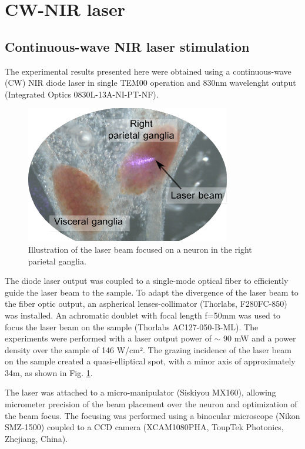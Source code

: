 \section{CW-NIR laser}
%

\subsection{Continuous-wave NIR laser stimulation}
The experimental results presented here were obtained using a continuous-wave (CW) NIR diode laser in single TEM00 operation and 830nm wavelenght output (Integrated Optics 0830L-13A-NI-PT-NF). \begin{figure}
	\includegraphics{img/laser/laser-beam.pdf}
	\caption{Illustration of the laser beam focused on a neuron in the right parietal ganglia.}
	\label{fig:laser beam}
\end{figure} 
The diode laser output was coupled to a single-mode optical fiber to efficiently guide the laser beam to the sample. To adapt the divergence of the laser beam to the fiber optic output, an aspherical lenses-collimator (Thorlabs, F280FC-850) was installed. An achromatic doublet with focal length f=50mm was used to focus the laser beam on the sample (Thorlabs AC127-050-B-ML). The experiments were performed with a laser output power of $\sim$ 90 mW and a power density over the sample of 146 W/cm². The grazing incidence of the laser beam on the sample created a quasi-elliptical spot, with a minor axis of approximately 34{\textmu}m, as shown in Fig. \ref{fig:laser beam}.



The laser was attached to a micro-manipulator (Siskiyou MX160), allowing micrometer precision of the beam placement over the neuron and optimization of the beam focus. The focusing was performed using a binocular microscope (Nikon SMZ-1500) coupled to a CCD camera (XCAM1080PHA, ToupTek Photonics, Zhejiang, China).


